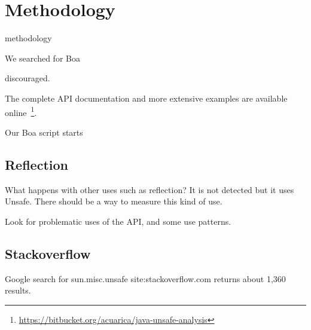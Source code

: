 
\section{Methodology} \label{sec:methodology}

methodology


We searched for Boa \cite{Dyer-Nguyen-Rajan-Nguyen-13}

 discouraged. 


The complete API documentation and more extensive examples are available online~\footnote{\url{https://bitbucket.org/acuarica/java-unsafe-analysis}}.

Our Boa script starts 


\subsection{Reflection}


What happens with other uses such as reflection? It is not detected but it uses Unsafe. There should be a way to measure this kind of use.

Look for problematic uses of the API, and some use patterns.



\subsection{Stackoverflow}

Google search for sun.misc.unsafe site:stackoverflow.com
returns about 1,360 results.
